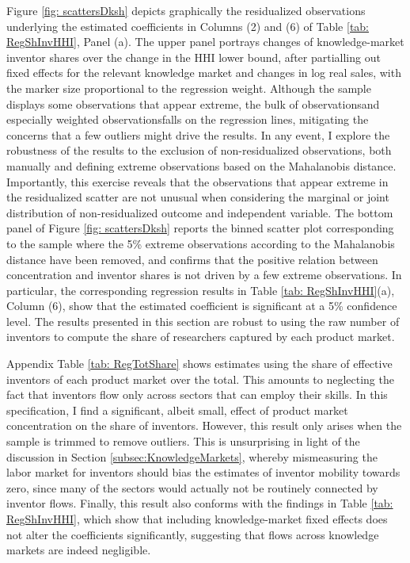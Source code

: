 Figure \ref{fig: scattersDksh} depicts graphically the residualized
observations underlying the estimated coefficients in Columns (2)
and (6) of Table \ref{tab: RegShInvHHI}, Panel (a). The upper panel
portrays changes of knowledge-market inventor shares over the change
in the HHI lower bound, after partialling out fixed effects for the
relevant knowledge market and changes in log real sales, with the
marker size proportional to the regression weight. Although the sample
displays some observations that appear extreme, the bulk of observations\textemdash and
especially weighted observations\textemdash falls on the regression
lines, mitigating the concerns that a few outliers might drive the
results. In any event, I explore the robustness of the results to
the exclusion of non-residualized observations, both manually and
defining extreme observations based on the Mahalanobis distance. Importantly,
this exercise reveals that the observations that appear extreme in
the residualized scatter are not unusual when considering the marginal
or joint distribution of non-residualized outcome and independent
variable. The bottom panel of Figure \ref{fig: scattersDksh} reports
the binned scatter plot corresponding to the sample where the 5\%
extreme observations according to the Mahalanobis distance have been
removed, and confirms that the positive relation between concentration
and inventor shares is not driven by a few extreme observations. In
particular, the corresponding regression results in Table \ref{tab: RegShInvHHI}(a),
Column (6), show that the estimated coefficient is significant at
a 5\% confidence level. The results presented in this section are
robust to using the raw number of inventors to compute the share of
researchers captured by each product market. 

Appendix Table \ref{tab: RegTotShare} shows estimates using the share
of effective inventors of each product market over the total. This
amounts to neglecting the fact that inventors flow only across sectors
that can employ their skills. In this specification, I find a significant,
albeit small, effect of product market concentration on the share
of inventors. However, this result only arises when the sample is
trimmed to remove outliers. This is unsurprising in light of the discussion
in Section \ref{subsec:KnowledgeMarkets}, whereby mismeasuring the
labor market for inventors should bias the estimates of inventor mobility
towards zero, since many of the sectors would actually not be routinely
connected by inventor flows. Finally, this result also conforms with
the findings in Table \ref{tab: RegShInvHHI}, which show that including
knowledge-market fixed effects does not alter the coefficients significantly,
suggesting that flows across knowledge markets are indeed negligible.

